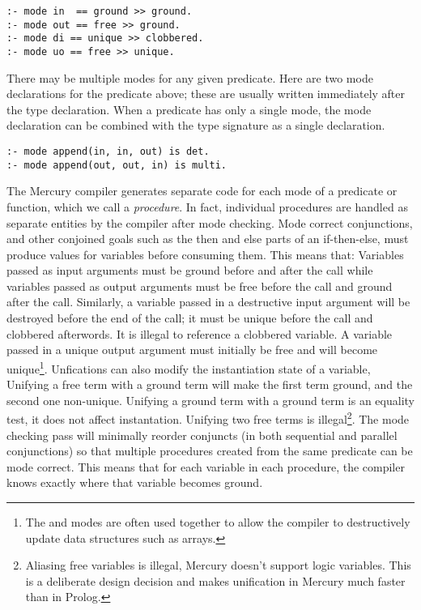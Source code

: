 \begin{verbatim}
:- mode in  == ground >> ground.
:- mode out == free >> ground.
:- mode di == unique >> clobbered.
:- mode uo == free >> unique.
\end{verbatim}

\noindent
There may be multiple modes for any given predicate.
Here are two mode declarations for the  predicate above;
these are usually written immediately after the type declaration.
When a predicate has only a single mode,
the mode declaration can be combined with the type signature as a single
declaration.

\begin{verbatim}
:- mode append(in, in, out) is det.
:- mode append(out, out, in) is multi.
\end{verbatim}

\noindent
The Mercury compiler generates separate code
for each mode of a predicate or function,
which we call a \emph{procedure}.
In fact, individual procedures are handled as separate entities by
the compiler after mode checking.
Mode correct conjunctions,
and other conjoined goals such as the then and else parts of an if-then-else,
must produce values for variables before consuming them.
This means that:
Variables passed as input arguments must be ground before and after the call
while variables passed as output arguments must be free before the call and
ground after the call.
Similarly, a variable passed in a destructive input argument will be destroyed
before the end of the call;
it must be unique before the call and clobbered afterwords.
It is illegal to reference a clobbered variable.
A variable passed in a unique output argument must initially be free and
will become unique\footnote{
    The \di and \uo modes are often used together to allow the compiler to
    destructively update data structures such as arrays.}.
Unfications can also modify the instantiation state of a variable,
Unifying a free term with a ground term will make the first term ground,
and the second one non-unique.
Unifying a ground term with a ground term is an equality test,
it does not affect instantation.
Unifying two free terms is illegal\footnote{
Aliasing free variables is illegal, Mercury doesn't support logic variables.
This is a deliberate design decision and makes unification in Mercury much
faster than in Prolog.}.
The mode checking pass will minimally reorder conjuncts 
(in both sequential and parallel conjunctions)
so that multiple procedures created from the same predicate can be mode
correct.
This means that for each variable in each procedure,
the compiler knows exactly where that variable becomes ground.

